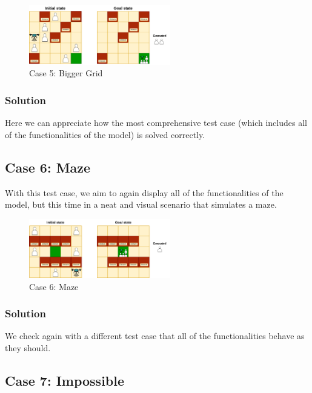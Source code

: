 \documentclass{article}
\begin{document}
\begin{figure}[ht]
    \centering
    \includegraphics[width=0.55\textwidth]{assets/problem-5-big.drawio.png}
    \caption{Case 5: Bigger Grid}
    \label{fig:initial-state-bigger-grid}
\end{figure}

\subsubsection{Solution}
Here we can appreciate how the most comprehensive test case (which includes all of the functionalities of the model) is solved correctly.

\subsection{Case 6: Maze}

With this test case, we aim to again display all of the functionalities of the model, but this time in a neat and visual scenario that simulates a maze.

\begin{figure}[ht]
    \centering
    \includegraphics[width=0.55\textwidth]{assets/problem-6-maze.drawio.png} %
    \caption{Case 6: Maze}
    \label{fig:initial-state-maze}
\end{figure}

\subsubsection{Solution}
We check again with a different test case that all of the functionalities behave as they should.

\subsection{Case 7: Impossible}
\end{document}
